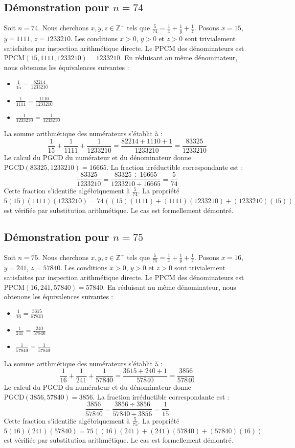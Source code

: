 \documentclass[12pt,a4paper]{article}
\begin{document}
\subsection{Démonstration pour $n = 74$}
Soit $n = 74$. Nous cherchons $x, y, z \in \mathbb{Z}^{+}$ tels que $\frac{5}{74} = \frac{1}{x} + \frac{1}{y} + \frac{1}{z}$.
Posons $x = 15$, $y = 1111$, $z = 1233210$.
Les conditions $x > 0$, $y > 0$ et $z > 0$ sont trivialement satisfaites par inspection arithmétique directe.
Le PPCM des dénominateurs est $\text{PPCM}(15, 1111, 1233210) = 1233210$.
En réduisant au même dénominateur, nous obtenons les équivalences suivantes :
\begin{itemize}
    \item $\frac{1}{15} = \frac{82214}{1233210}$
    \item $\frac{1}{1111} = \frac{1110}{1233210}$
    \item $\frac{1}{1233210} = \frac{1}{1233210}$
\end{itemize}
La somme arithmétique des numérateurs s'établit à :
$$ \frac{1}{15} + \frac{1}{1111} + \frac{1}{1233210} = \frac{82214 + 1110 + 1}{1233210} = \frac{83325}{1233210} $$
Le calcul du PGCD du numérateur et du dénominateur donne $\text{PGCD}(83325, 1233210) = 16665$.
La fraction irréductible correspondante est :
$$ \frac{83325}{1233210} = \frac{83325 \div 16665}{1233210 \div 16665} = \frac{5}{74} $$
Cette fraction s'identifie algébriquement à $\frac{5}{74}$.
La propriété $5(15)(1111)(1233210) = 74((15)(1111) + (1111)(1233210) + (1233210)(15))$ est vérifiée par substitution arithmétique.
Le cas est formellement démontré.

\subsection{Démonstration pour $n = 75$}
Soit $n = 75$. Nous cherchons $x, y, z \in \mathbb{Z}^{+}$ tels que $\frac{5}{75} = \frac{1}{x} + \frac{1}{y} + \frac{1}{z}$.
Posons $x = 16$, $y = 241$, $z = 57840$.
Les conditions $x > 0$, $y > 0$ et $z > 0$ sont trivialement satisfaites par inspection arithmétique directe.
Le PPCM des dénominateurs est $\text{PPCM}(16, 241, 57840) = 57840$.
En réduisant au même dénominateur, nous obtenons les équivalences suivantes :
\begin{itemize}
    \item $\frac{1}{16} = \frac{3615}{57840}$
    \item $\frac{1}{241} = \frac{240}{57840}$
    \item $\frac{1}{57840} = \frac{1}{57840}$
\end{itemize}
La somme arithmétique des numérateurs s'établit à :
$$ \frac{1}{16} + \frac{1}{241} + \frac{1}{57840} = \frac{3615 + 240 + 1}{57840} = \frac{3856}{57840} $$
Le calcul du PGCD du numérateur et du dénominateur donne $\text{PGCD}(3856, 57840) = 3856$.
La fraction irréductible correspondante est :
$$ \frac{3856}{57840} = \frac{3856 \div 3856}{57840 \div 3856} = \frac{1}{15} $$
Cette fraction s'identifie algébriquement à $\frac{5}{75}$.
La propriété $5(16)(241)(57840) = 75((16)(241) + (241)(57840) + (57840)(16))$ est vérifiée par substitution arithmétique.
Le cas est formellement démontré.
\end{document}
